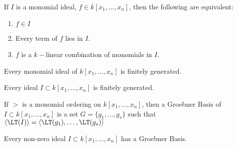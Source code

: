 \documentclass[crop=false,class=book,oneside]{standalone}
\begin{document}
\begin{theorem}
If $I$ is a monomial ideal, $f\in k[x_1,\hdots ,x_n]$, then the following are equivalent:
\begin{enumerate}
    \item $f\in I$
    \item Every term of $f$ lies in $I$.
    \item $f$ is a $k-$linear combination of monomials in $I$.
\end{enumerate}
\end{theorem}
\begin{theorem}
Every monomial ideal of $k[x_1,\hdots ,x_n]$ is finitely generated.
\end{theorem}
\begin{theorem}
Every ideal $I\subset k[x_1,\hdots ,x_n]$ is finitely generated.
\end{theorem}
\begin{definition}
If $>$ is a monomial ordering on $k[x_1,\hdots ,x_n]$, then a Groebner Basis of $I\subset k[x_1,\hdots ,x_n]$ is a set $G = \{g_1,\hdots, g_s\}$ such that $\langle \LT(I)\rangle = \langle \LT(g_1),\hdots, \LT(g_s)\rangle$
\end{definition}
\begin{theorem}
Every non-zero ideal $I\subset k[x_1,\hdots ,x_n]$ has a Groebner Basis.
\end{theorem}
\end{document}
